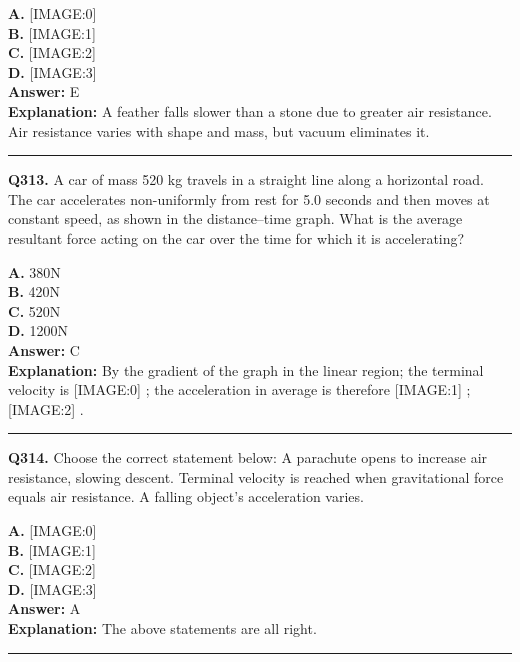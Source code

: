 \documentclass[12pt]{article}
\begin{document}
\textbf{A.} [IMAGE:0] \\
\textbf{B.} [IMAGE:1] \\
\textbf{C.} [IMAGE:2] \\
\textbf{D.} [IMAGE:3] \\

\textbf{Answer:} E \\
\textbf{Explanation:} A feather falls slower than a stone due to greater air resistance. Air resistance varies with shape and mass, but vacuum eliminates it.

\hrule
\vspace{1em}


\noindent
\textbf{Q313.} A car of mass 520 kg travels in a straight line along a horizontal road.
The car accelerates non-uniformly from rest for 5.0 seconds and then moves at constant speed, as shown in the distance–time graph.
What is the average resultant force acting on the car over the time for which it is accelerating?



\textbf{A.} 380N \\
\textbf{B.} 420N \\
\textbf{C.} 520N \\
\textbf{D.} 1200N \\

\textbf{Answer:} C \\
\textbf{Explanation:} By the gradient of the graph in the linear region; the terminal velocity is
[IMAGE:0]
; the acceleration in average is therefore
[IMAGE:1]
;
[IMAGE:2]
.

\hrule
\vspace{1em}


\noindent
\textbf{Q314.} Choose the correct statement below:
A parachute opens to increase air resistance, slowing descent.
Terminal velocity is reached when gravitational force equals air resistance.
A falling object’s acceleration varies.



\textbf{A.} [IMAGE:0] \\
\textbf{B.} [IMAGE:1] \\
\textbf{C.} [IMAGE:2] \\
\textbf{D.} [IMAGE:3] \\

\textbf{Answer:} A \\
\textbf{Explanation:} The above statements are all right.

\hrule
\vspace{1em}
\end{document}
